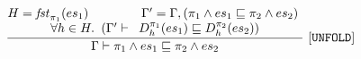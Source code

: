\begin{gather*}
\frac{ \begin{matrix}
\text{{\tt{\ensuremath{H = \mathit{fst}_{{\pi_1}}(\textcolor{black}{{es}}_1)\qquad\qquad \Gamma^\prime = \Gamma,  (
{\pi_1} \wedge \textcolor{black}{{es}}_1 \sqsubseteq {\pi_2} \wedge \textcolor{black}{{es}}_2
)}}} }\\
    \text{{\tt{\ensuremath{\forall h\in H. \   (\Gamma^\prime  \vdash \   D_{h}^{{\pi_1}}( \textcolor{black}{{es}}_1) \sqsubseteq    D_{h}^{{\pi_2}}( \textcolor{black}{{es}}_2) )}}}}
  \end{matrix}}
   { \text{{\tt{\ensuremath{  \Gamma  \vdash {\pi_1} \wedge \textcolor{black}{{es}}_1 \sqsubseteq {\pi_2} \wedge \textcolor{black}{{es}}_2 }}}}}\  {\tt{\ensuremath{[UNFOLD]}}} 
\end{gather*}